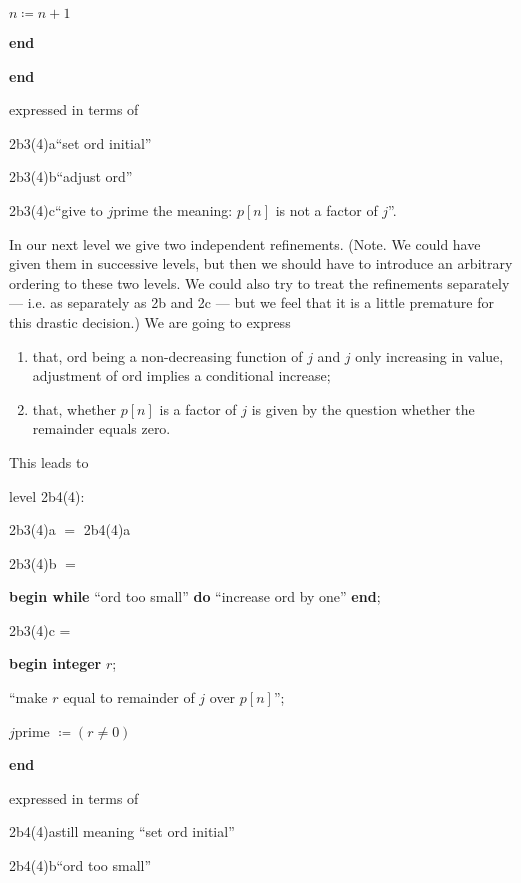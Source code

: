 \noindent
\quad\quad\quad $n \coloneq n + 1$

\noindent
\quad\textbf{end}

\noindent
\textbf{end}

\noindent
expressed in terms of

\noindent
2b3(4)a\quad\quad ``set ord initial''

\noindent
2b3(4)b\quad\quad ``adjust ord''

\noindent
2b3(4)c\quad\quad ``give to $j$prime the meaning: $p[n]$ is not a factor of $j$''. 

In our next level we give two independent refinements. (Note. We could have given them in successive levels, but then we should have to introduce an arbitrary ordering to these two levels. We could also try to treat the refinements separately --- i.e. as separately as 2b and 2c --- but we feel that it is a little premature for this drastic decision.) We are going to express

\begin{enumerate}[label=(\arabic*)]
	\item that, ord being a non-decreasing function of $j$ and $j$ only increasing in value, adjustment of ord implies a conditional increase;

	\item that, whether $p[n]$ is a factor of $j$ is given by the question whether the remainder equals zero.
\end{enumerate}

\noindent
This leads to

\noindent
level 2b4(4):

\noindent
2b3(4)a $=$ 2b4(4)a

\noindent
2b3(4)b $=$

\noindent
\textbf{begin while} ``ord too small'' \textbf{do} ``increase ord by one'' \textbf{end};

\noindent
2b3(4)c =

\noindent
\textbf{begin integer} $r$;

\noindent
\quad ``make $r$ equal to remainder of $j$ over $p[n]$'';

\noindent
\quad $j$prime $\coloneq (r \neq 0)$

\noindent
\textbf{end}

\noindent
expressed in terms of

\noindent
2b4(4)a\quad\quad still meaning ``set ord initial''

\noindent
2b4(4)b\quad\quad ``ord too small''

